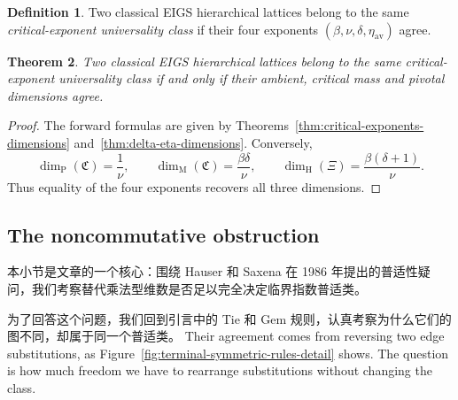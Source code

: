 \documentclass[scheme=plain,11pt]{ctexart}
\newtheorem{theorem}{Theorem}[section]
\theoremstyle{definition}
\newtheorem{definition}[theorem]{Definition}
\theoremstyle{remark}
\newcommand{\dimhaus}{\dim_{\mathrm H}}
\newcommand{\dimmass}{\dim_{\mathrm M}}
\begin{document}
\begin{definition}\label{def:general-class}
Two classical EIGS hierarchical lattices belong to the same \emph{critical-exponent universality class} if their four exponents $(\beta,\nu,\delta,\eta_{\mathrm{av}})$ agree.
\end{definition}

\begin{theorem}\label{thm:exponent-class-dimensions}\label{def:static-class}
Two classical EIGS hierarchical lattices belong to the same critical-exponent universality class if and only if their ambient, critical mass and pivotal dimensions agree.
\end{theorem}
\begin{proof}
The forward formulas are given by Theorems~\ref{thm:critical-exponents-dimensions} and~\ref{thm:delta-eta-dimensions}.
Conversely,
\[
 \dim_{\mathrm P}(\mathfrak C)=\frac1\nu,\qquad
 \dimmass(\mathfrak C)=\frac{\beta\delta}{\nu},\qquad
 \dimhaus(\Xi)=\frac{\beta(\delta+1)}{\nu}.
\]
Thus equality of the four exponents recovers all three dimensions.
\end{proof}


\subsection{The noncommutative obstruction}\label{sec:noncommuting}\label{sec:forward}


本小节是文章的一个核心：围绕 Hauser 和 Saxena 在 1986 年提出的普适性疑问，我们考察替代乘法型维数是否足以完全决定临界指数普适类。


为了回答这个问题，我们回到引言中的 Tie 和 Gem 规则，认真考察为什么它们的图不同，却属于同一个普适类。
Their agreement comes from reversing two edge substitutions, as Figure~\ref{fig:terminal-symmetric-rules-detail} shows.
The question is how much freedom we have to rearrange substitutions without changing the class.
\end{document}
